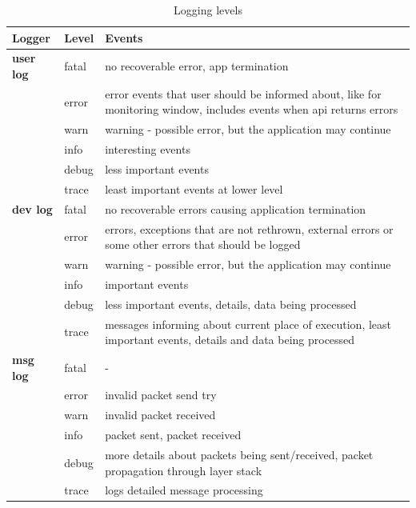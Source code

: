 \begin{table}
\scriptsize
\begin{center}
\begin{tabular}{p{2.0cm} p{2.0cm} p{10.5cm}}
	\hline
	\textbf{Logger}				& \textbf{Level}	& \textbf{Events}					\\[1mm]
    \hline
	\textbf{user log}			& fatal				& no recoverable error, app termination		\\[1.5mm]	
								& error				& error events that user should be informed about, like for monitoring window, includes events when api returns errors		\\[1.5mm]	
								& warn				& warning - possible error, but the application may continue		\\[1.5mm]	
								& info				& interesting events		\\[1.5mm]	
								& debug				& less important events		\\[1.5mm]	
								& trace				& least important events at lower level		\\[1.5mm]
	\hline
	\textbf{dev log}			& fatal				& no recoverable errors causing application termination		\\[1.5mm]	
								& error				& errors, exceptions that are not rethrown, external errors or some other errors that should be logged		\\[1.5mm]	
								& warn				& warning - possible error, but the application may continue		\\[1.5mm]	
								& info				& important events		\\[1.5mm]	
								& debug				& less important events, details, data being processed		\\[1.5mm]	
								& trace				& messages informing about current place of execution, least important events, details and data being processed		\\[1.5mm]
    \hline
	\textbf{msg log}			& fatal				& -		\\[1.5mm]	
								& error				& invalid packet send try		\\[1.5mm]	
								& warn				& invalid packet received		\\[1.5mm]	
								& info				& packet sent, packet received		\\[1.5mm]	
								& debug				& more details about packets being sent/received, packet propagation through layer stack		\\[1.5mm]	
								& trace				& logs detailed message processing		\\[1.5mm]
	\hline
\end{tabular}
\end{center}
\caption{Logging levels}
\label{tab:libLogLevels}
\end{table}





